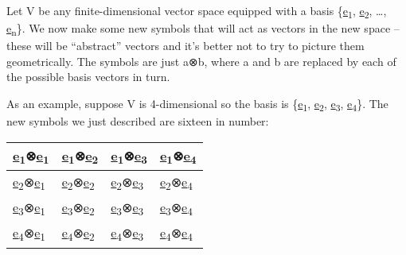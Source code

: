 \documentclass[oneside,english]{amsbook}
\numberwithin{section}{chapter}
\theoremstyle{plain}
\theoremstyle{definition}
\begin{document}
Let V be any finite-dimensional vector space equipped with a basis
\{\ul{e}\textsubscript{1}, \ul{e}\textsubscript{2}, \ldots,
\ul{e}\textsubscript{n}\}. We now make some new symbols that will act as
vectors in the new space -- these will be ``abstract'' vectors and it's
better not to try to picture them geometrically. The symbols are just
a⊗b, where a and b are replaced by each of the possible basis vectors in
turn.

As an example, suppose V is 4-dimensional so the basis is
\{\ul{e}\textsubscript{1}, \ul{e}\textsubscript{2},
\ul{e}\textsubscript{3}, \ul{e}\textsubscript{4}\}. The new symbols we
just described are sixteen in number:

\begin{longtable}[]{@{}
		>{\centering\arraybackslash}p{}
		>{\centering\arraybackslash}p{}
		>{\centering\arraybackslash}p{}
		>{\centering\arraybackslash}p{}@{}}
	\toprule\noalign{}
	\begin{minipage}[b]{\linewidth}\centering
		\ul{e}\textsubscript{1}⊗\ul{e}\textsubscript{1}
	\end{minipage} & \begin{minipage}[b]{\linewidth}\centering
		\ul{e}\textsubscript{1}⊗\ul{e}\textsubscript{2}
	\end{minipage} & \begin{minipage}[b]{\linewidth}\centering
		\ul{e}\textsubscript{1}⊗\ul{e}\textsubscript{3}
	\end{minipage} & \begin{minipage}[b]{\linewidth}\centering
		\ul{e}\textsubscript{1}⊗\ul{e}\textsubscript{4}
	\end{minipage} \\
	\midrule\noalign{}
	\endhead
	\bottomrule\noalign{}
	\endlastfoot
	\ul{e}\textsubscript{2}⊗\ul{e}\textsubscript{1} &
	\ul{e}\textsubscript{2}⊗\ul{e}\textsubscript{2} &
	\ul{e}\textsubscript{2}⊗\ul{e}\textsubscript{3} &
	\ul{e}\textsubscript{2}⊗\ul{e}\textsubscript{4} \\
	\ul{e}\textsubscript{3}⊗\ul{e}\textsubscript{1} &
	\ul{e}\textsubscript{3}⊗\ul{e}\textsubscript{2} &
	\ul{e}\textsubscript{3}⊗\ul{e}\textsubscript{3} &
	\ul{e}\textsubscript{3}⊗\ul{e}\textsubscript{4} \\
	\ul{e}\textsubscript{4}⊗\ul{e}\textsubscript{1} &
	\ul{e}\textsubscript{4}⊗\ul{e}\textsubscript{2} &
	\ul{e}\textsubscript{4}⊗\ul{e}\textsubscript{3} &
	\ul{e}\textsubscript{4}⊗\ul{e}\textsubscript{4} \\
\end{longtable}
\end{document}
